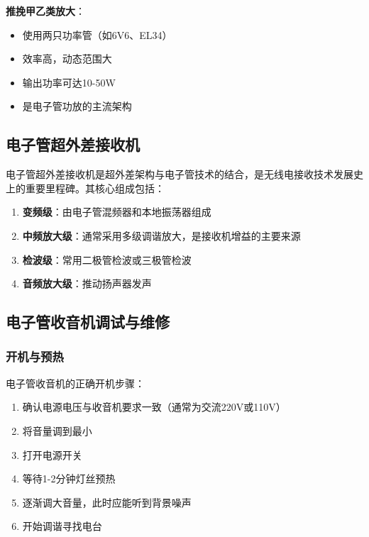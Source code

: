 \textbf{推挽甲乙类放大}：
\begin{itemize}
    \item 使用两只功率管（如6V6、EL34）
    \item 效率高，动态范围大
    \item 输出功率可达10-50W
    \item 是电子管功放的主流架构
\end{itemize}

\subsection{电子管超外差接收机}
\label{sec:tube_superheterodyne}

电子管超外差接收机是超外差架构与电子管技术的结合，是无线电接收技术发展史上的重要里程碑。其核心组成包括：

\begin{enumerate}
    \item \textbf{变频级}：由电子管混频器和本地振荡器组成
    \item \textbf{中频放大级}：通常采用多级调谐放大，是接收机增益的主要来源
    \item \textbf{检波级}：常用二极管检波或三极管检波
    \item \textbf{音频放大级}：推动扬声器发声
\end{enumerate}

\subsection{电子管收音机调试与维修}
\label{sec:tube_radio_maintenance}

\subsubsection{开机与预热}
\label{sec:tube_radio_startup}

电子管收音机的正确开机步骤：

\begin{enumerate}
    \item 确认电源电压与收音机要求一致（通常为交流220V或110V）
    \item 将音量调到最小
    \item 打开电源开关
    \item 等待1-2分钟灯丝预热
    \item 逐渐调大音量，此时应能听到背景噪声
    \item 开始调谐寻找电台
\end{enumerate}

